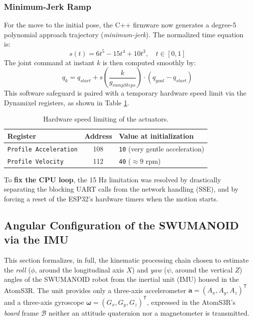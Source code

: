 \documentclass{tropLaClasse}
\begin{document}
\subsubsection{Minimum-Jerk Ramp}

For the move to the initial pose, the C++ firmware now generates a degree-5 polynomial approach trajectory (\textit{minimum-jerk}). The normalized time equation is:
\begin{equation}
s(t) = 6t^5 - 15t^4 + 10t^3, \quad t \in [0,1]
\end{equation}
The joint command at instant $k$ is then computed smoothly by:
\begin{equation}
q_k = q_{start} + s\left(\frac{k}{g_{rampSteps}}\right) \cdot (q_{goal} - q_{start})
\end{equation}
This software safeguard is paired with a temporary hardware speed limit via the Dynamixel registers, as shown in Table \ref{tab:hardware_profile}.

\begin{table}[h]
\centering
\begin{tabular}{|l|c|l|}
\hline
\textbf{Register} & \textbf{Address} & \textbf{Value at initialization} \\ \hline
\texttt{Profile Acceleration} & 108 & \texttt{10} (very gentle acceleration) \\ \hline
\texttt{Profile Velocity} & 112 & \texttt{40} ($\approx 9$ rpm) \\ \hline
\end{tabular}
\caption{Hardware speed limiting of the actuators.}
\label{tab:hardware_profile}
\end{table}

To \textbf{fix the CPU loop}, the 15 Hz limitation was resolved by drastically separating the blocking UART calls from the network handling (SSE), and by forcing a reset of the ESP32's hardware timers when the motion starts.




\subsection{Angular Configuration of the SWUMANOID via the IMU}
\label{subsubsec:calcul_angle}

This section formalizes, in full, the kinematic processing chain chosen to estimate the \emph{roll} ($\phi$, around the longitudinal axis $X$) and \emph{yaw} ($\psi$, around the vertical $Z$) angles of the SWUMANOID robot from the inertial unit (IMU) housed in the AtomS3R. The unit provides only a three-axis accelerometer $\mathbf{a}=(A_x,A_y,A_z)^{\mathsf T}$ and a three-axis gyroscope $\boldsymbol{\omega}=(G_x,G_y,G_z)^{\mathsf T}$, expressed in the AtomS3R's \emph{board} frame $\mathcal{B}$ neither an attitude quaternion nor a magnetometer is transmitted.
\end{document}
